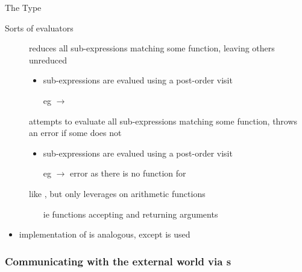 \documentclass[handout]{beamer}
\begin{document}
\begin{frame}[allowframebreaks]{The  Type}
    \begin{block}{Sorts of evaluators}
        \begin{description}
            \item[] reduces all sub-expressions matching some function, leaving others unreduced
            \begin{itemize}\small
                \item sub-expressions are evalued using a \alert{post-order} visit
                \item[eg]  $\rightarrow$ 
            \end{itemize}
            \item[] attempts to evaluate all sub-expressions matching some function, throws an error if some does not
            \begin{itemize}\small
                \item sub-expressions are evalued using a \alert{post-order} visit
                \item[eg]  $\rightarrow$ error as there is no function for 
            \end{itemize}
            \item[] like , but only leverages on arithmetic functions
            \begin{itemize}\small
                \item[ie] functions accepting and returning  arguments
            \end{itemize}
        \end{description}
    \end{block}

    \framebreak

    \begin{itemize}\small
        \item implementation of  is analogous, except  is used
    \end{itemize}
\end{frame}

\subsubsection{Communicating with the external world via s}
\end{document}
